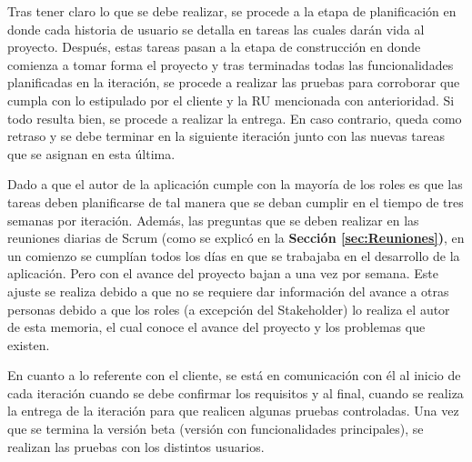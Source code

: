 Tras tener claro lo que se debe realizar, se procede a la etapa de planificación en donde cada historia de usuario se detalla en tareas las cuales darán vida al proyecto. Después, estas tareas pasan a la etapa de construcción en donde comienza a tomar forma el proyecto y tras terminadas todas las funcionalidades planificadas en la iteración, se procede a realizar las pruebas para corroborar que cumpla con lo estipulado por el cliente y la RU mencionada con anterioridad. Si todo resulta bien, se procede a realizar la entrega. En caso contrario, queda como retraso y se debe terminar en la siguiente iteración junto con las nuevas tareas que se asignan en esta última.

Dado a que el autor de la aplicación cumple con la mayoría de los roles es que las tareas deben planificarse de tal manera que se deban cumplir en el tiempo de tres semanas por iteración. Además, las preguntas que se deben realizar en las reuniones diarias de Scrum (como se explicó en la \textbf{Sección \ref{sec:Reuniones})}, en un comienzo se cumplían todos los días en que se trabajaba en el desarrollo de la aplicación. Pero con el avance del proyecto bajan a una vez por semana. Este ajuste se realiza debido a que no se requiere dar información del avance a otras personas debido a que los roles (a excepción del Stakeholder) lo realiza el autor de esta memoria, el cual conoce el avance del proyecto y los problemas que existen.

En cuanto a lo referente con el cliente, se está en comunicación con él al inicio de cada iteración cuando se debe confirmar los requisitos y al final, cuando se realiza la entrega de la iteración para que realicen algunas pruebas controladas. Una vez que se termina la versión beta (versión con funcionalidades principales), se realizan las pruebas con los distintos usuarios.